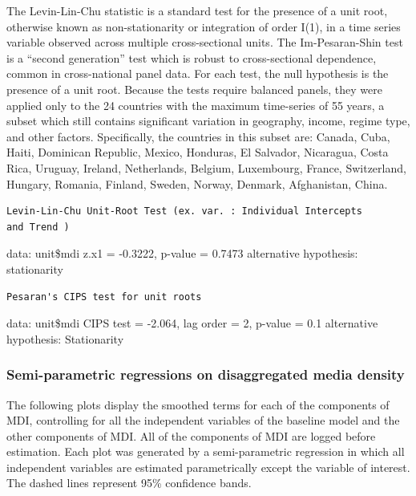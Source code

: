 \documentclass[11pt,article,oneside]{memoir}
\begin{document}
The Levin-Lin-Chu statistic is a standard test for the presence of a
unit root, otherwise known as non-stationarity or integration of order
I(1), in a time series variable observed across multiple cross-sectional
units. The Im-Pesaran-Shin test is a ``second generation'' test which is
robust to cross-sectional dependence, common in cross-national panel
data. For each test, the null hypothesis is the presence of a unit root.
Because the tests require balanced panels, they were applied only to the
24 countries with the maximum time-series of 55 years, a subset which
still contains significant variation in geography, income, regime type,
and other factors. Specifically, the countries in this subset are:
Canada, Cuba, Haiti, Dominican Republic, Mexico, Honduras, El Salvador,
Nicaragua, Costa Rica, Uruguay, Ireland, Netherlands, Belgium,
Luxembourg, France, Switzerland, Hungary, Romania, Finland, Sweden,
Norway, Denmark, Afghanistan, China.

\begin{verbatim}
Levin-Lin-Chu Unit-Root Test (ex. var. : Individual Intercepts
and Trend )
\end{verbatim}

data: unit\$mdi z.x1 = -0.3222, p-value = 0.7473 alternative hypothesis:
stationarity

\begin{verbatim}
Pesaran's CIPS test for unit roots
\end{verbatim}

data: unit\$mdi CIPS test = -2.064, lag order = 2, p-value = 0.1
alternative hypothesis: Stationarity

\subsubsection{Semi-parametric regressions on disaggregated media
density}\label{semi-parametric-regressions-on-disaggregated-media-density}

The following plots display the smoothed terms for each of the
components of MDI, controlling for all the independent variables of the
baseline model and the other components of MDI. All of the components of
MDI are logged before estimation. Each plot was generated by a
semi-parametric regression in which all independent variables are
estimated parametrically except the variable of interest. The dashed
lines represent 95\% confidence bands.
\end{document}
